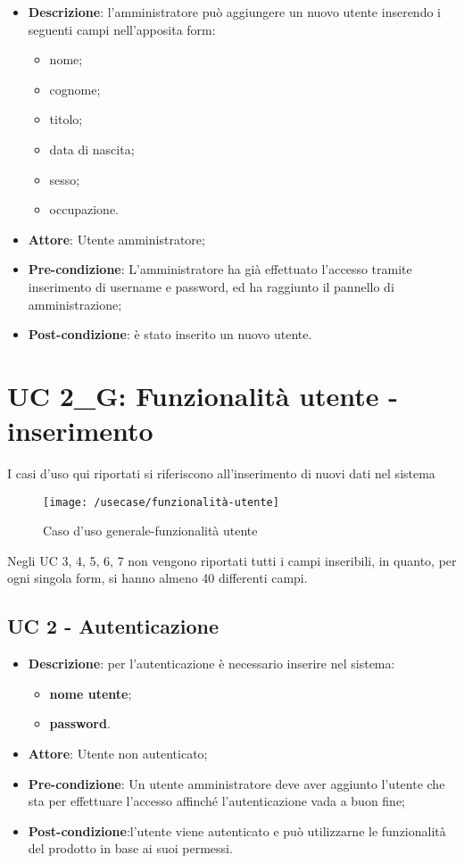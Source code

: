 \begin{itemize}
	\item \textbf{Descrizione}: l'amministratore può aggiungere un nuovo utente inserendo i seguenti campi nell'apposita form:
	\begin{itemize}
		\item nome;
		\item cognome;
		\item titolo;
		\item data di nascita;
		\item sesso;
		\item occupazione.
	\end{itemize}
	\item \textbf{Attore}: Utente amministratore;
	\item \textbf{Pre-condizione}: L'amministratore ha già effettuato l'accesso tramite inserimento di username e password, ed ha raggiunto il pannello di amministrazione;
	\item \textbf{Post-condizione}: è stato inserito un nuovo utente.
\end{itemize}

\newpage

\section{UC 2\_G: Funzionalità utente - inserimento}

I casi d'uso qui riportati si riferiscono all'inserimento di nuovi dati nel sistema

\begin{figure}[h]
	\centering
	\texttt{[image: /usecase/funzionalità-utente]}
	\caption{Caso d'uso generale-funzionalità utente}
\end{figure}

Negli UC 3, 4, 5, 6, 7 non vengono riportati tutti i campi inseribili, in quanto, per ogni singola form, si hanno almeno 40 differenti campi.\\

\subsection{UC 2 - Autenticazione}

\begin{itemize}
	\item \textbf{Descrizione}: per l'autenticazione è necessario inserire nel sistema:
	\begin{itemize}
		\item \textbf{nome utente};
		\item \textbf{password}.
	\end{itemize}
	\item \textbf{Attore}: Utente non autenticato;
	\item \textbf{Pre-condizione}: Un utente amministratore deve aver aggiunto l'utente che sta per effettuare l'accesso affinché l'autenticazione vada a buon fine;
	\item \textbf{Post-condizione}:l'utente viene autenticato e può utilizzarne le funzionalità del prodotto in base ai suoi permessi.
\end{itemize}

